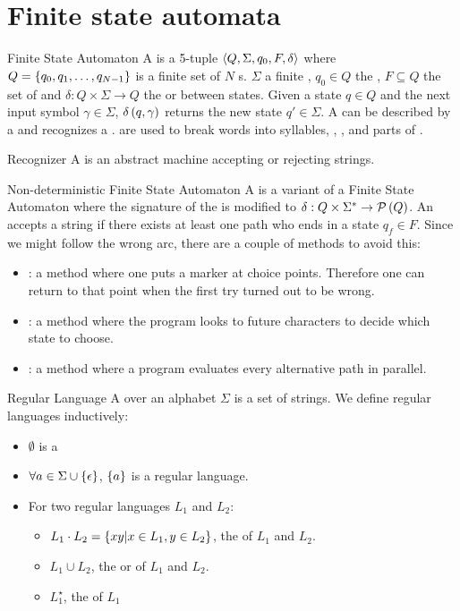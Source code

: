 \section{Finite state automata}
\begin{df}[FSA]{Finite State Automaton}
A \sb{} is a 5-tuple $\left\langle Q,\Sigma,q_0,F,\delta\right\rangle$ where $Q=\left\{q_0,q_1,\ldots,q_{N-1}\right\}$ is a finite set of $N$ s. $\Sigma$  a finite , $q_0\in Q$ the , $F\subseteq Q$ the set of  and $\delta:Q\times\Sigma\rightarrow Q$ the  or  between states. Given a state $q\in Q$ and the next input symbol $\gamma\in\Sigma$, $\delta\left(q,\gamma\right)$ returns the new state $q'\in\Sigma$. A \sb{} can be described by a  and recognizes a . \sb{} are used to break words into syllables, , , and parts of .
\end{df}
\begin{df}{Recognizer}
A \sb{} is an abstract machine accepting or rejecting strings.
\end{df}
\begin{df}[NFSA]{Non-deterministic Finite State Automaton}
A \sb{} is a variant of a Finite State Automaton where the signature of the  is modified to $\delta:Q\times\Sigma^*\rightarrow\mathcal{P}\left(Q\right)$. An \ab{} accepts a string if there exists at least one path who ends in a state $q_f\in F$. Since we might follow the wrong arc, there are a couple of methods to avoid this:
\begin{itemize}
 \item {}: a method where one puts a marker at choice points. Therefore one can return to that point when the first try turned out to be wrong.
 \item {}: a method where the program looks to future characters to decide which state to choose.
 \item {}: a method where a program evaluates every alternative path in parallel.
\end{itemize}
\end{df}
\begin{df}{Regular Language}
A \sb{} over an alphabet $\Sigma$ is a set of strings. We define regular languages inductively:
\begin{itemize}
 \item $\emptyset$ is a \sb{}
 \item $\forall a\in\Sigma\cup\left\{\epsilon\right\}$, $\left\{a\right\}$ is a regular language.
 \item For two regular languages $L_1$ and $L_2$:
 \begin{itemize}
  \item $L_1\cdot L_2=\left\{xy|x\in L_1,y\in L_2\right\}$, the  of $L_1$ and $L_2$.
  \item $L_1\cup L_2$, the  or  of $L_1$ and $L_2$.
  \item $L_1^{\star}$, the  of $L_1$
 \end{itemize}
\end{itemize}
\end{df}
